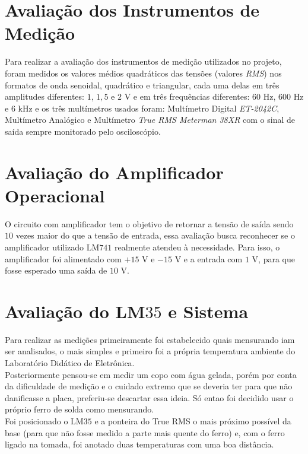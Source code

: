 \documentclass[14pt, oneside]{book}
\newcommand\tab[1][1cm]{\hspace*{#1}}
\theoremstyle{definition}
\begin{document}
            \section{Avaliação dos Instrumentos de Medição}
                \tab Para realizar a avaliação dos instrumentos de medição utilizados no projeto, foram medidos os valores médios quadráticos das tensões (valores \textit{RMS}) nos formatos de onda senoidal, quadrático e triangular, cada uma delas em três amplitudes diferentes: $1$, $1,5$ e $2$ V e em três frequências diferentes: $60$ Hz, $600$ Hz e $6$ kHz e os três multímetros usados foram: Multímetro Digital \textit{ ET-2042C}, Multímetro Analógico  e Multímetro \textit{True RMS Meterman 38XR} com o sinal de saída sempre monitorado pelo osciloscópio.
                
            \section{Avaliação do Amplificador Operacional}
                \tab O circuito com amplificador tem o objetivo de retornar a tensão de saída sendo $10$ vezes maior do que a tensão de entrada, essa avaliação busca reconhecer se o amplificador utilizado LM$741$ realmente atendeu à necessidade. Para isso, o amplificador foi alimentado com $+15$ V e $-15$ V e a entrada com $1$ V, para que fosse esperado uma saída de $10$ V.
                
            \section{Avaliação do LM$35$ e Sistema}
                \tab Para realizar as medições primeiramente foi estabelecido quais mensurando iam ser analisados, o mais simples e primeiro foi a própria temperatura ambiente do Laboratório Didático de Eletrônica. \\
                \tab Posteriormente pensou-se em medir um copo com água gelada, porém por conta da dificuldade de medição e o cuidado extremo que se deveria ter para que não danificasse a placa, preferiu-se descartar essa ideia. Só entao foi decidido usar o próprio ferro de solda como mensurando. \\
                \tab Foi posicionado o LM$35$ e a ponteira do True RMS o mais próximo possível da base (para que não fosse medido a parte mais quente do ferro) e, com o ferro ligado na tomada, foi anotado duas temperaturas com uma boa distância.
                
\end{document}
